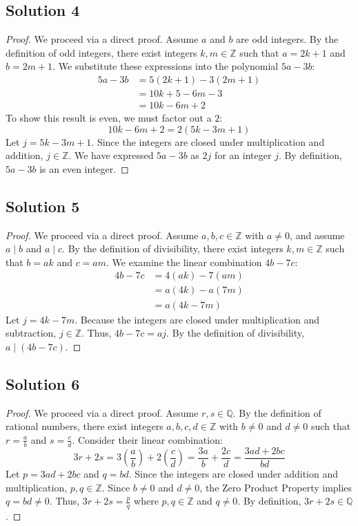 \documentclass[12pt]{article}
\begin{document}
\subsection*{Solution 4}
\begin{proof}
We proceed via a direct proof. Assume $a$ and $b$ are odd integers. By the definition of odd integers, there exist integers $k, m \in \mathbb{Z}$ such that $a = 2k + 1$ and $b = 2m + 1$. We substitute these expressions into the polynomial $5a - 3b$:
\begin{align*}
    5a - 3b &= 5(2k + 1) - 3(2m + 1) \\
            &= 10k + 5 - 6m - 3 \\
            &= 10k - 6m + 2
\end{align*}
To show this result is even, we must factor out a $2$:
\[ 10k - 6m + 2 = 2(5k - 3m + 1) \]
Let $j = 5k - 3m + 1$. Since the integers are closed under multiplication and addition, $j \in \mathbb{Z}$. We have expressed $5a - 3b$ as $2j$ for an integer $j$. By definition, $5a - 3b$ is an even integer.
\end{proof}

\subsection*{Solution 5}
\begin{proof}
We proceed via a direct proof. Assume $a, b, c \in \mathbb{Z}$ with $a \neq 0$, and assume $a \mid b$ and $a \mid c$. By the definition of divisibility, there exist integers $k, m \in \mathbb{Z}$ such that $b = ak$ and $c = am$. We examine the linear combination $4b - 7c$:
\begin{align*}
    4b - 7c &= 4(ak) - 7(am) \\
            &= a(4k) - a(7m) \\
            &= a(4k - 7m)
\end{align*}
Let $j = 4k - 7m$. Because the integers are closed under multiplication and subtraction, $j \in \mathbb{Z}$. Thus, $4b - 7c = aj$. By the definition of divisibility, $a \mid (4b - 7c)$.
\end{proof}

\subsection*{Solution 6}
\begin{proof}
We proceed via a direct proof. Assume $r, s \in \mathbb{Q}$. By the definition of rational numbers, there exist integers $a, b, c, d \in \mathbb{Z}$ with $b \neq 0$ and $d \neq 0$ such that $r = \frac{a}{b}$ and $s = \frac{c}{d}$. Consider their linear combination:
\[ 3r + 2s = 3\left(\frac{a}{b}\right) + 2\left(\frac{c}{d}\right) = \frac{3a}{b} + \frac{2c}{d} = \frac{3ad + 2bc}{bd} \]
Let $p = 3ad + 2bc$ and $q = bd$. Since the integers are closed under addition and multiplication, $p, q \in \mathbb{Z}$. Since $b \neq 0$ and $d \neq 0$, the Zero Product Property implies $q = bd \neq 0$. Thus, $3r + 2s = \frac{p}{q}$ where $p, q \in \mathbb{Z}$ and $q \neq 0$. By definition, $3r + 2s \in \mathbb{Q}$.
\end{proof}
\end{document}

